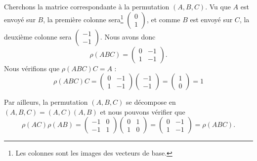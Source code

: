 \begin{example}
    Cherchons la matrice correspondante à la permutation \( (A,B,C)\). Vu que \( A\) est envoyé sur \( B\), la première colonne sera\footnote{Les colonnes sont les images des vecteurs de base.} \( \begin{pmatrix}
        0    \\ 
        1    
    \end{pmatrix}\), et comme \( B\) est envoyé sur \( C\), la deuxième colonne sera \( \begin{pmatrix}
        -1    \\ 
        -1    
    \end{pmatrix}\). Nous avons donc
    \begin{equation}
        \rho(ABC)=\begin{pmatrix}
            0    &   -1    \\ 
            1    &   -1    
        \end{pmatrix}.
    \end{equation}
    Nous vérifions que \( \rho(ABC)C=A\) :
    \begin{equation}
        \rho(ABC)C=
        \begin{pmatrix}
            0    &   -1    \\ 
            1    &   -1    
        \end{pmatrix}\begin{pmatrix}
            -1    \\ 
            -1    
        \end{pmatrix}=\begin{pmatrix}
            1    \\ 
            0    
        \end{pmatrix}=1
    \end{equation}

    Par ailleurs, la permutation \( (A,B,C)\) se décompose en \( (A,B,C)=(A,C)(A,B)\) et nous pouvons vérifier que
    \begin{equation}
        \rho(AC)\rho(AB)=\begin{pmatrix}
            -1    &   0    \\ 
            -1    &   1    
        \end{pmatrix}\begin{pmatrix}
            0    &   1    \\ 
            1    &   0    
        \end{pmatrix}=\begin{pmatrix}
            0    &   -1    \\ 
            1    &   -1    
        \end{pmatrix}=\rho(ABC).
    \end{equation}
\end{example}

